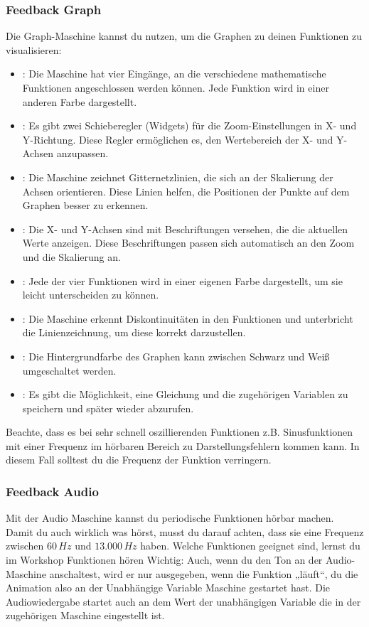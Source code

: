 \documentclass[12pt]{report}
\begin{document}
\subsubsection{Feedback Graph}
Die Graph-Maschine kannst du nutzen, um die Graphen zu deinen Funktionen zu visualisieren:
\begin{itemize}
    \item {}: Die Maschine hat vier Eingänge, an die verschiedene mathematische Funktionen angeschlossen werden können. Jede Funktion wird in einer anderen Farbe dargestellt.
    \item {}: Es gibt zwei Schieberegler (Widgets) für die Zoom-Einstellungen in X- und Y-Richtung. Diese Regler ermöglichen es, den Wertebereich der X- und Y-Achsen anzupassen.
    \item {}: Die Maschine zeichnet Gitternetzlinien, die sich an der Skalierung der Achsen orientieren. Diese Linien helfen, die Positionen der Punkte auf dem Graphen besser zu erkennen.
    \item {}: Die X- und Y-Achsen sind mit Beschriftungen versehen, die die aktuellen Werte anzeigen. Diese Beschriftungen passen sich automatisch an den Zoom und die Skalierung an.
    \item {}: Jede der vier Funktionen wird in einer eigenen Farbe dargestellt, um sie leicht unterscheiden zu können.
    \item {}: Die Maschine erkennt Diskontinuitäten in den Funktionen und unterbricht die Linienzeichnung, um diese korrekt darzustellen.
    \item {}: Die Hintergrundfarbe des Graphen kann zwischen Schwarz und Weiß umgeschaltet werden.
    \item {}: Es gibt die Möglichkeit, eine Gleichung und die zugehörigen Variablen zu speichern und später wieder abzurufen.
  \end{itemize}
Beachte, dass es bei sehr schnell oszillierenden Funktionen z.B. Sinusfunktionen mit einer Frequenz im hörbaren Bereich zu Darstellungsfehlern kommen kann. In diesem Fall solltest du die Frequenz der Funktion verringern.  
\subsubsection{Feedback Audio}
Mit der Audio Maschine kannst du periodische Funktionen hörbar machen. Damit du auch wirklich was hörst, musst du darauf achten, dass sie eine Frequenz zwischen $60\,Hz$ und $13.000\, Hz$ haben. Welche Funktionen geeignet sind, lernst du im Workshop Funktionen hören  
Wichtig: Auch, wenn du den Ton an der Audio-Maschine anschaltest, wird er nur ausgegeben, wenn die Funktion „läuft“, du die Animation also an der Unabhängige Variable Maschine gestartet hast. Die Audiowiedergabe startet auch an dem Wert der unabhängigen Variable die in der zugehörigen Maschine eingestellt ist.
\end{document}
